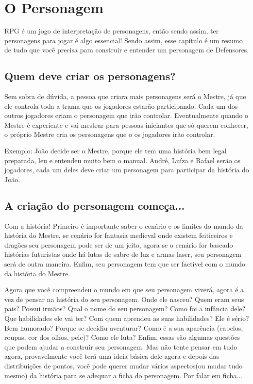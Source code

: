 \chapter{O Personagem}

RPG é um jogo de interpretação de personagens, então sendo assim, ter personagens para jogar é algo essencial! Sendo assim, esse capítulo é um resumo de tudo que você precisa para construir e entender um personagem de Defensores.

\section{Quem deve criar os personagens?}

Sem sobra de dúvida, a pessoa que criara mais personagens será o Mestre, já que ele controla toda a trama que os jogadores estarão participando. Cada um dos outros jogadores criam o personagem que irão controlar. Eventualmente quando o Mestre é experiente e vai mestrar para pessoas iniciantes que só querem conhecer, o próprio Mestre cria os personagens que o os jogadores irão controlar. 

Exemplo: João decide ser o Mestre, porque ele tem uma história bem legal preparada, leu e entendeu muito bem o manual. André, Luíza e Rafael serão os jogadores, cada um deles deve criar um personagem para participar da história do João.

\section{A criação do personagem começa...}

Com a história! Primeiro é importante saber o cenário e os limites do mundo da história do Mestre, se cenário for fantasia medieval onde existem feiticeiros e dragões seu personagem pode ser de um jeito, agora se o cenário for baseado histórias futuristas onde há lutas de sabre de luz e armas laser, seu personagem será de outra maneira. Enfim, seu personagem tem que ser factível com o mundo da história do Mestre.

Agora que você compreendeu o mundo em que seu personagem viverá, agora é a vez de pensar na história do seu personagem. Onde ele nasceu? Quem eram seus pais? Possui irmãos? Qual o nome do seu personagem? Como foi a infância dele? Que habilidades ele vai ter? Com quem aprendeu as suas habilidades? Ele é sério? Bem humorado? Porque se decidiu aventurar? Como é a sua aparência (cabelos, roupas, cor dos olhos, pele)? Como ele luta? Enfim, essas são algumas questões que podem ajudar a construir seu personagem. Mas não tente pensar em tudo agora, provavelmente você terá uma ideia básica dele agora e depois das distribuições de pontos, você pode querer mudar vários aspectos(ou mudar tudo mesmo) da história para se adequar a ficha do personagem. Por falar em ficha...

